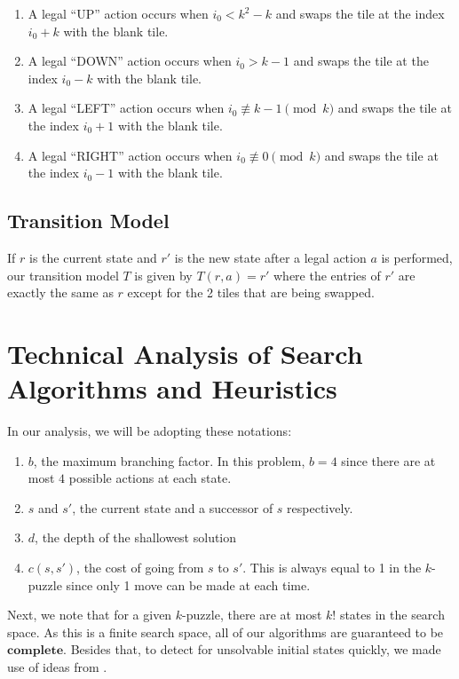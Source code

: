 \documentclass[runningheads]{llncs}
\begin{document}
\begin{enumerate}
    \item A legal ``UP'' action occurs when $i_0 < k^{2} - k$ and swaps the tile at the index $i_0 + k$ with the blank tile.
    
    \item A legal ``DOWN'' action occurs when $i_0 > k - 1$ and swaps the tile at the index $i_0 - k$ with the blank tile.
    
    \item A legal ``LEFT'' action occurs when $i_0 \not\equiv k - 1 \pmod{k}$ and swaps the tile at the index $i_0 + 1$ with the blank tile.
    
    \item A legal ``RIGHT'' action occurs when $i_0 \not\equiv 0 \pmod{k}$ and swaps the tile at the index $i_0 - 1$ with the blank tile.
\end{enumerate}

\subsection{Transition Model}
If $r$ is the current state and $r'$ is the new state after a legal action $a$ is performed, our transition model $T$ is given by $ T(r, a) = r' $
where the entries of $r'$ are exactly the same as $r$ except for the 2 tiles that are being swapped. 

\section{Technical Analysis of Search Algorithms and Heuristics}
In our analysis, we will be adopting these notations: 
\begin{enumerate}
    \item $b$, the maximum branching factor. In this problem, $b = 4$ since there are at most $4$ possible actions at each state.
    \item $s$ and $s'$, the current state and a successor of $s$ respectively.
    \item $d$, the depth of the shallowest solution
    \item $c(s, s')$, the cost of going from $s$ to $s'$. This is always equal to 1 in the $k$-puzzle since only 1 move can be made at each time.
\end{enumerate}

Next, we note that for a given $k$-puzzle, there are at most $k!$ states in the search space. As this is a finite search space, all of our algorithms are guaranteed to be $\mathbf{complete}$. Besides that, to detect for unsolvable initial states quickly, we made use of ideas from \cite{ref_1}. 
\end{document}
